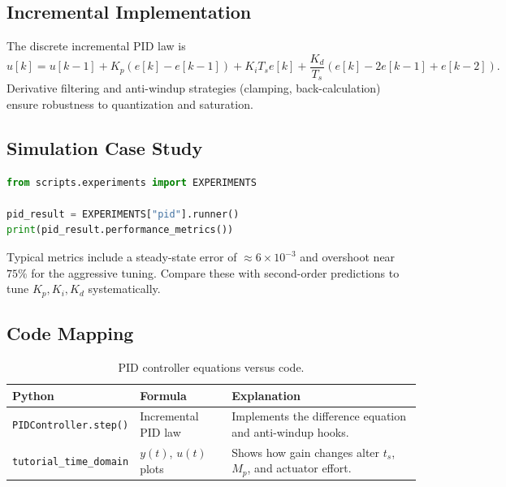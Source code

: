 \subsection{Incremental Implementation}
The discrete incremental PID law is
\[
    u[k] = u[k-1] + K_p (e[k] - e[k-1]) + K_i T_s e[k] + \frac{K_d}{T_s} (e[k] - 2 e[k-1] + e[k-2]).
\]
Derivative filtering and anti-windup strategies (clamping, back-calculation) ensure robustness to quantization and saturation.

\subsection{Simulation Case Study}
\begin{lstlisting}[language=python]
from scripts.experiments import EXPERIMENTS

pid_result = EXPERIMENTS["pid"].runner()
print(pid_result.performance_metrics())
\end{lstlisting}
Typical metrics include a steady-state error of $\approx 6\times 10^{-3}$ and overshoot near $75\%$ for the aggressive tuning. Compare these with second-order predictions to tune $K_p,K_i,K_d$ systematically.

\subsection{Code Mapping}
\begin{table}[h]
    \centering
    \small
    \renewcommand{\arraystretch}{1.2}
    \begin{tabularx}{\linewidth}{|>{\raggedright\arraybackslash}p{4cm}|X|X|}
        \hline
        \textbf{Python} & \textbf{Formula} & \textbf{Explanation} \\
        \hline
        \texttt{PIDController.step()} & Incremental PID law & Implements the difference equation and anti-windup hooks. \\
        \hline
        \texttt{tutorial\_time\_domain} & $y(t)$, $u(t)$ plots & Shows how gain changes alter $t_s$, $M_p$, and actuator effort. \\
        \hline
    \end{tabularx}
    \caption{PID controller equations versus code.}
\end{table}

